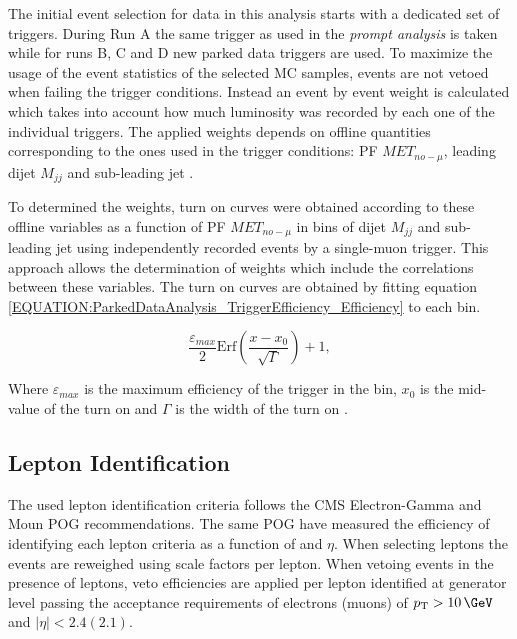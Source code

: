 
The initial event selection for data in this analysis starts with a dedicated set of triggers. During Run A the same trigger as used in the \textit{prompt analysis} is taken while for runs B, C and D new parked data triggers are used. To maximize the usage of the event statistics of the selected \gls{MC} samples, events are not vetoed  when failing the trigger conditions. Instead an event by event weight is calculated which takes into account how much luminosity was recorded by each one of the individual triggers. The applied weights depends on offline quantities corresponding to the ones used in the trigger conditions: \gls{PF} $MET_{no-\mu}$, leading dijet $M_{jj}$ and sub-leading jet \pt. 

To determined the weights, turn on curves were obtained according to these offline variables as a function of \gls{PF} $MET_{no-\mu}$ in bins of dijet $M_{jj}$ and sub-leading jet \pt using independently recorded events by a single-muon trigger. This approach allows the determination of weights which include the correlations between these variables. The turn on curves are obtained by fitting equation \ref{EQUATION:ParkedDataAnalysis_TriggerEfficiency_Efficiency} to each bin.

\begin{equation}
\frac{\varepsilon_{max}}{2}\text{Erf}\left(\frac{x-x_{0}}{\sqrt{\Gamma}}\right)+1,
\label{EQUATION:ParkedDataAnalysis_TriggerEfficiency_Efficiency} 
\end{equation}

Where $\varepsilon_{max}$ is the maximum efficiency of the trigger in the bin, $x_{0}$ is the mid-value of the turn on and $\Gamma$ is the width of the turn on \cite{ARTICLE:CMSVBFHiggsToInvAndZHCombination}.

\subsection{Lepton Identification}


The used lepton identification criteria follows the \gls{CMS} Electron-Gamma and Moun \gls{POG} recommendations. The same \gls{POG} have measured the efficiency of identifying each lepton criteria as a function of \pt and $\eta$. When selecting leptons the events are reweighed using scale factors per lepton. When vetoing events in the presence of leptons, veto efficiencies are applied per lepton identified at generator level passing the acceptance requirements of electrons (muons) of $\pt>10\,\GeV$ and $|\eta|<2.4(2.1)$.

